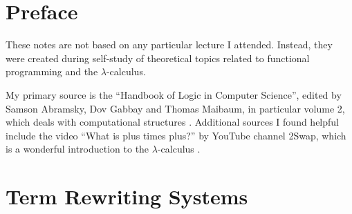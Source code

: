 \documentclass{report}
\newcommand*{\newpar}{\par\vspace{\baselineskip}\noindent}
\begin{document}
\newtheorem{lemma}{Lemma}[section]
\newtheorem{theorem}[lemma]{Theorem}

\theoremstyle{definition}
\newtheorem{definition}[lemma]{Definition}
\newtheorem{example}[lemma]{Example}
%
%
%

\tableofcontents
\thispagestyle{fancy}
%
%
%
\chapter*{Preface}
These notes are not based on any particular lecture I attended. Instead, they were created during self-study of theoretical topics related to functional programming and the $\lambda$-calculus.
\newpar
My primary source is the ``Handbook of Logic in Computer Science'', edited by Samson Abramsky, Dov  Gabbay and Thomas Maibaum, in particular volume 2, which deals with computational structures \cite{handbookvol2}.  Additional sources I found helpful include the video ``What is plus times plus?'' by YouTube channel 2Swap, which is a wonderful introduction to the $\lambda$-calculus \cite{2swap}.
%
%
%
\chapter{Term Rewriting Systems}
\end{document}
